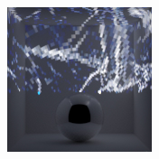 \begin{figure}[]
\begin{subfigure}{\textwidth}
\begin{subfigure}{0.19\textwidth}
            \caption*{}
        \end{subfigure}
        \hfill
        \begin{subfigure}{0.19\textwidth}
            \centering
            \includegraphics[width=\textwidth]{images/04-experiment03/ball/marble/pixel_proj.jpg}
            \caption*{}
        \end{subfigure}


\end{subfigure}
\end{figure}
